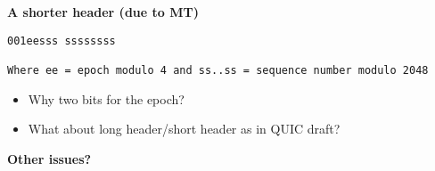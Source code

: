 \documentclass[helvetica]{seminar}
\newcommand{\heading}[1]{%
  \begin{center} 
    \large\bf 
    #1 
  \end{center} 
  \vspace{.4 in}}
\begin{document}
\begin{slide}
\heading{A shorter header (due to MT)}

\begin{verbatim}
001eesss ssssssss

Where ee = epoch modulo 4 and ss..ss = sequence number modulo 2048
\end{verbatim}

\begin{itemize}
\item Why two bits for the epoch?
\item What about long header/short header as in QUIC draft?
\end{itemize}

\end{slide}

\begin{slide}
\heading{Other issues?}

\end{slide}
\end{document}

